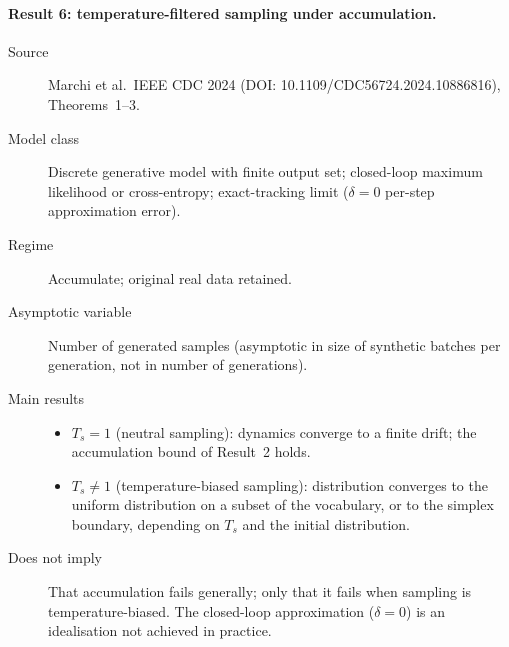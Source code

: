 \paragraph{Result 6: temperature-filtered sampling under accumulation.}
\begin{description}
\item[Source] Marchi et al.\ IEEE CDC 2024 (DOI: 10.1109/CDC56724.2024.10886816),
  Theorems~1--3.
\item[Model class] Discrete generative model with finite output set; closed-loop
  maximum likelihood or cross-entropy; exact-tracking limit ($\delta = 0$ per-step
  approximation error).
\item[Regime] Accumulate; original real data retained.
\item[Asymptotic variable] Number of generated samples (asymptotic in size of
  synthetic batches per generation, not in number of generations).
\item[Main results]
  \begin{itemize}
  \item $T_s = 1$ (neutral sampling): dynamics converge to a finite drift; the
    accumulation bound of Result~2 holds.
  \item $T_s \neq 1$ (temperature-biased sampling): distribution converges to
    the uniform distribution on a subset of the vocabulary, or to the simplex
    boundary, depending on $T_s$ and the initial distribution.
  \end{itemize}
\item[Does not imply] That accumulation fails generally; only that it fails when
  sampling is temperature-biased. The closed-loop approximation ($\delta = 0$) is an
  idealisation not achieved in practice.
\end{description}
